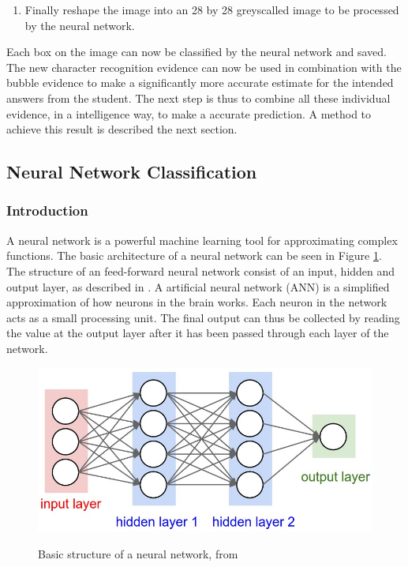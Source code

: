 \begin{enumerate}
\item Finally reshape the image into an 28 by 28 greyscalled image to be processed by the neural network.
\end{enumerate}

Each box on the image can now be classified by the neural network and  saved. The new character recognition evidence can now be used in combination with the bubble evidence to make a significantly more accurate estimate for the intended answers from the student. The next step is thus to combine all these individual evidence, in a intelligence way, to make a accurate prediction. A method to achieve this result is described the next section.


\subsection{Neural Network Classification}

\subsubsection{Introduction}

A neural network is a powerful machine learning tool for approximating complex functions. The basic architecture of a neural network can be seen in Figure \ref{fig:nn}. The structure of an feed-forward neural network consist of an input, hidden and output layer, as described in \citet{MichealN2015}. A artificial neural network (ANN) is a simplified approximation of how neurons in the brain works. Each neuron in the network acts as a small processing unit. The final output can thus be collected by reading the value at the output layer after it has been passed through each layer of the network.

\begin{figure}
  \centering
  \includegraphics[width=14cm]{NN}\\
  \caption{Basic structure of a neural network, from \citet{karpathy2017}}%
  \label{fig:nn}
\end{figure}


